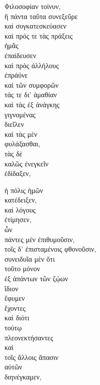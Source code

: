 {\large
\begin{greek}
\noindent Φιλοσοφίαν τοίνυν, \\
\tabto{2em} ἣ πάντα ταῦτα συνεξεῦρε \\
\tabto{2em} καὶ συγκατεσκεύασεν \\
\tabto{2em} καὶ πρός τε τὰς πράξεις \\
\tabto{6em} ἡμᾶς \\
\tabto{6em} ἐπαίδευσεν \\
\tabto{4em} καὶ πρὸς ἀλλήλους \\
\tabto{6em} ἐπράϋνε \\
\tabto{4em} καὶ τῶν συμφορῶν \\
\tabto{6em} τάς τε δι' ἀμαθίαν \\
\tabto{6em} καὶ τὰς ἐξ ἀνάγκης \\
\tabto{8em} γιγνομένας \\
\tabto{4em} διεῖλεν \\
\tabto{4em} καὶ τὰς μὲν \\
\tabto{6em} φυλάξασθαι, \\
\tabto{4em} τὰς δὲ \\
\tabto{6em} καλῶς ἐνεγκεῖν \\
\tabto{4em} ἐδίδαξεν,

\noindent ἡ πόλις ἡμῶν \\
κατέδειξεν, \\
καὶ λόγους \\
ἐτίμησεν, \\
\tabto{2em} ὧν \\
\tabto{4em} πάντες μὲν ἐπιθυμοῦσιν, \\
\tabto{4em} τοῖς δ' ἐπισταμένοις φθονοῦσιν, \\
συνειδυῖα μὲν ὅτι \\
\tabto{2em} τοῦτο μόνον \\
\tabto{4em} ἐξ ἁπάντων τῶν ζῴων \\
\tabto{2em} ἴδιον \\
\tabto{4em} ἔφυμεν \\
\tabto{2em} ἔχοντες \\
\tabto{2em} καὶ διότι \\
\tabto{4em} τούτῳ \\
\tabto{2em} πλεονεκτήσαντες \\
\tabto{2em} καὶ \\
\tabto{4em} τοῖς ἄλλοις ἅπασιν \\
\tabto{6em} αὐτῶν \\
\tabto{4em} διηνέγκαμεν,


\end{greek}}
